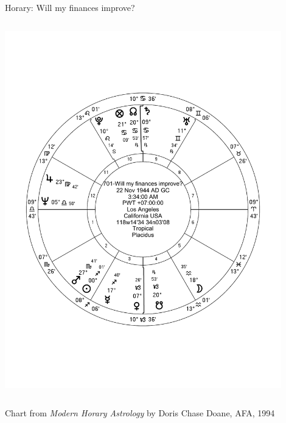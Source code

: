 \begin{frame}[t]{Horary: Will my finances improve?}
\begin{columns}[T, onlytextwidth]
\vspace{-20px}
\begin{center}
{\includegraphics[width=0.9\textwidth]{charts/Doane-701}} \\

\end{center}
\end{columns}
\scriptsize
Chart from \textsl{Modern Horary Astrology} by Doris Chase Doane, AFA, 1994
\end{frame}